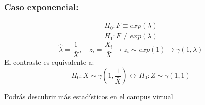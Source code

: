 \subsubsection*{Caso exponencial:}

\[
\begin{matrix}
    H_0:F \equiv exp(\lambda) \\
    H_1:F \neq exp(\lambda)
\end{matrix}
\]
\[
    \widehat{\lambda}=\frac{1}{\bar{X}}, \quad z_i
    =\frac{X_i}{\bar{X}} \to z_i \sim exp(1) \longrightarrow\gamma(1,\lambda)
\]
El contraste es equivalente a:
\[
    H_0: X \sim \gamma\left(1,\frac{1}{\bar{X}}\right) \longleftrightarrow H_0:Z \sim \gamma(1,1)
\]

Podrás descubrir más estadísticos en el campus virtual
